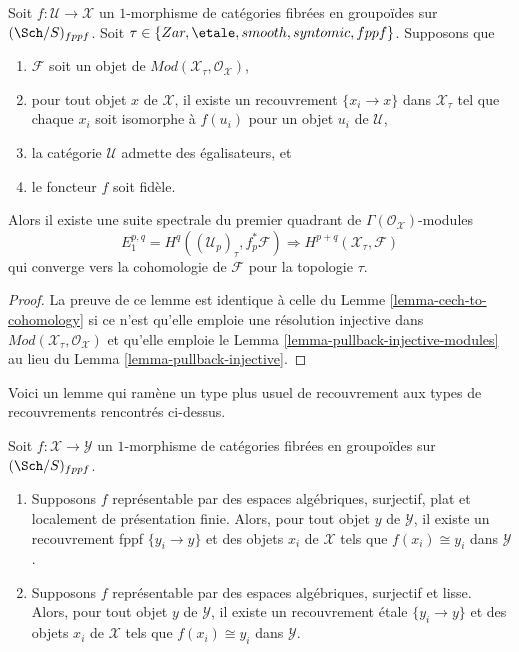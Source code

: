 \begin{lemma}
\label{lemma-cech-to-cohomology-modules}
Soit $f : \mathcal{U} \to \mathcal{X}$ un $1$-morphisme de catégories fibrées
en groupoïdes sur $(\Sch/S)_{fppf}$. Soit
$\tau \in \{Zar, \etale, smooth, syntomic, fppf\}$.
Supposons que
\begin{enumerate}
\item $\mathcal{F}$ soit un objet de
$\textit{Mod}(\mathcal{X}_\tau, \mathcal{O}_\mathcal{X})$,
\item pour tout objet $x$ de $\mathcal{X}$, il existe un recouvrement
$\{x_i \to x\}$ dans $\mathcal{X}_\tau$ tel que chaque $x_i$ soit isomorphe
à $f(u_i)$ pour un objet $u_i$ de $\mathcal{U}$,
\item la catégorie $\mathcal{U}$ admette des égalisateurs, et
\item le foncteur $f$ soit fidèle.
\end{enumerate}
Alors il existe une suite spectrale du premier quadrant de
$\Gamma(\mathcal{O}_\mathcal{X})$-modules
$$
E_1^{p, q} = H^q((\mathcal{U}_p)_\tau, f_p^*\mathcal{F})
\Rightarrow
H^{p + q}(\mathcal{X}_\tau, \mathcal{F})
$$
qui converge vers la cohomologie de $\mathcal{F}$ pour la topologie $\tau$.
\end{lemma}

\begin{proof}
La preuve de ce lemme est identique à celle du
Lemme \ref{lemma-cech-to-cohomology}
si ce n'est qu'elle emploie une résolution injective dans
$\textit{Mod}(\mathcal{X}_\tau, \mathcal{O}_\mathcal{X})$
et qu'elle emploie le
Lemma \ref{lemma-pullback-injective-modules}
au lieu du
Lemma \ref{lemma-pullback-injective}.
\end{proof}

\noindent
Voici un lemme qui ramène un type plus usuel de recouvrement aux
types de recouvrements rencontrés ci-dessus.

\begin{lemma}
\label{lemma-surjective-flat-locally-finite-presentation}
Soit $f : \mathcal{X} \to \mathcal{Y}$ un $1$-morphisme de
catégories fibrées en groupoïdes sur $(\Sch/S)_{fppf}$.
\begin{enumerate}
\item Supposons $f$ représentable par des espaces algébriques, surjectif,
plat et localement de présentation finie. Alors, pour tout objet $y$ de
$\mathcal{Y}$, il existe un recouvrement fppf $\{y_i \to y\}$ et des objets
$x_i$ de $\mathcal{X}$ tels que $f(x_i) \cong y_i$ dans $\mathcal{Y}$.
\item Supposons $f$ représentable par des espaces algébriques, surjectif
et lisse. Alors, pour tout objet $y$ de
$\mathcal{Y}$, il existe un recouvrement étale $\{y_i \to y\}$ et des objets
$x_i$ de $\mathcal{X}$ tels que $f(x_i) \cong y_i$ dans $\mathcal{Y}$.
\end{enumerate}
\end{lemma}

